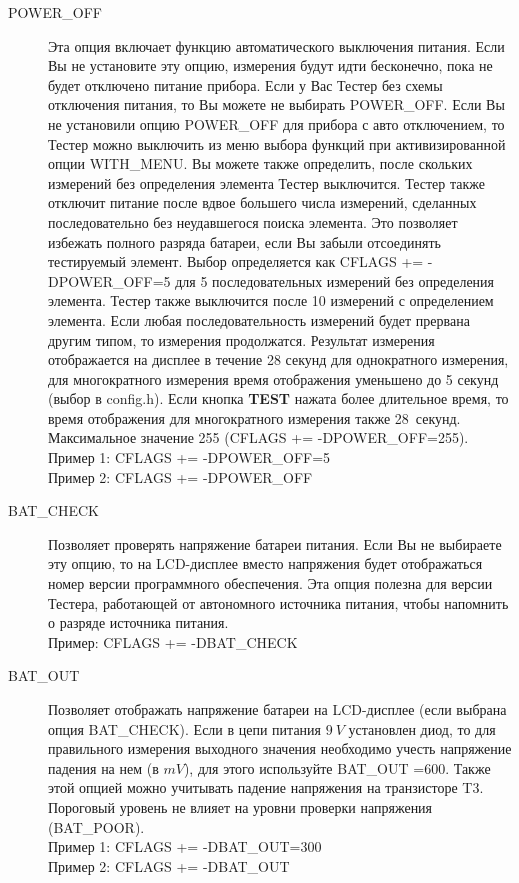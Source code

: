\begin{description}
  \item[POWER\_OFF] Эта опция включает функцию автоматического выключения питания. Если Вы не установите эту опцию, 
измерения будут идти бесконечно, пока не будет отключено питание прибора. Если у Вас Тестер без 
схемы отключения питания, то Вы можете не выбирать POWER\_OFF.
Если Вы не установили опцию POWER\_OFF для прибора с авто отключением, то Тестер можно выключить из меню 
выбора функций при активизированной опции WITH\_MENU.
Вы можете также определить, после скольких измерений без определения элемента Тестер выключится. Тестер также 
отключит питание после вдвое большего числа измерений, сделанных последовательно без неудавшегося поиска элемента. 
Это позволяет избежать полного разряда батареи, если Вы забыли отсоединять тестируемый элемент. Выбор определяется 
как CFLAGS += -DPOWER\_OFF=5 для 5 последовательных измерений без определения элемента. Тестер также выключится 
после 10 измерений с определением элемента. Если любая последовательность измерений будет прервана другим типом, 
то измерения продолжатся. Результат измерения отображается на дисплее в течение 28 секунд для однократного 
измерения, для многократного измерения время отображения уменьшено до 5 секунд (выбор в config.h). Если кнопка 
\textbf{ TEST} нажата более длительное время, то время отображения для многократного измерения также 28~секунд. 
Максимальное значение 255 (CFLAGS += -DPOWER\_OFF=255).\\
Пример 1: CFLAGS += -DPOWER\_OFF=5\\
Пример 2: CFLAGS += -DPOWER\_OFF

  \item[BAT\_CHECK] Позволяет проверять напряжение батареи питания. Если Вы не выбираете эту опцию, то на  
LCD-дисплее вместо напряжения будет отображаться номер версии программного обеспечения. Эта опция полезна для 
версии Тестера, работающей от автономного источника питания, чтобы напомнить о разряде источника питания.\\
Пример: CFLAGS += -DBAT\_CHECK

  \item[BAT\_OUT] Позволяет отображать напряжение батареи на LCD-дисплее (если выбрана опция BAT\_CHECK). Если 
в цепи питания \(9~V\) установлен диод, то для правильного измерения выходного значения необходимо учесть напряжение 
падения на нем (в \(mV\)), для этого используйте  BAT\_OUT =600. Также этой опцией можно учитывать падение напряжения 
на транзисторе T3. Пороговый уровень не влияет на уровни проверки напряжения (BAT\_POOR).\\
Пример 1: CFLAGS += -DBAT\_OUT=300\\
Пример 2: CFLAGS += -DBAT\_OUT


\end{description}
